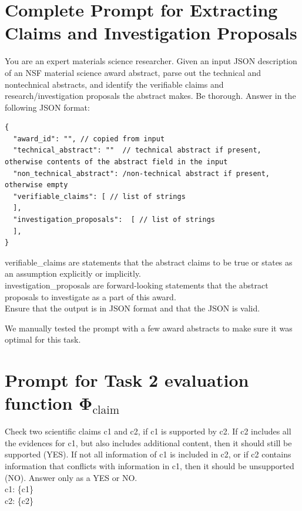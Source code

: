 \documentclass[11pt]{article}
\begin{document}
\appendix

\section{Complete Prompt for Extracting Claims and Investigation Proposals}
\label{appendix:claude-claim-extraction}
\begin{mdframed}[backgroundcolor=blue!20]
\noindent You are an expert materials science researcher. Given an input JSON description of an NSF material science award abstract, parse out the technical and nontechnical abstracts, and identify the verifiable claims and research/investigation proposals the abstract makes. Be thorough. Answer in the following JSON format:
\begin{lstlisting}
{
  "award_id": "", // copied from input
  "technical_abstract": ""  // technical abstract if present, otherwise contents of the abstract field in the input
  "non_technical_abstract": /non-technical abstract if present, otherwise empty
  "verifiable_claims": [ // list of strings
  ],
  "investigation_proposals":  [ // list of strings
  ],
}    
\end{lstlisting}

\noindent verifiable\_claims are statements that the abstract claims to be true or states as an assumption explicitly or implicitly. \\
\noindent investigation\_proposals are forward-looking statements that the abstract proposals to investigate as a part of this award. \\
\noindent Ensure that the output is in JSON format and that the JSON is valid.
\end{mdframed}
We manually tested the prompt with a few award abstracts to make sure it was optimal for this task.

\section{Prompt for Task 2 evaluation function $\mathbf{\Phi}_{\textrm{claim}}$}
\label{appendix:phi_claim}
\begin{mdframed}[backgroundcolor=blue!20]
\noindent Check two scientific claims c1 and c2, if c1 is supported by c2. If c2 includes all the evidences for c1, but also includes additional content, then it should still be supported (YES). If not all information of c1 is included in c2, or if c2 contains information that conflicts with information in c1, then it should be unsupported (NO). Answer only as a YES or NO.\\
\noindent c1: \{c1\}\\
\noindent c2: \{c2\}
\end{mdframed}
\end{document}
